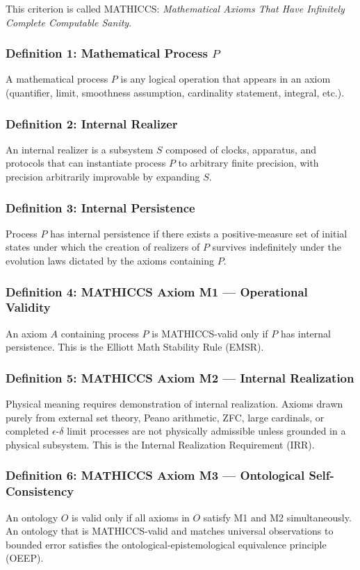 \documentclass[11pt,a4paper]{article}
\begin{document}
This criterion is called MATHICCS: \emph{Mathematical Axioms That Have Infinitely Complete Computable Sanity}.

\subsubsection{Definition 1: Mathematical Process $P$}
A mathematical process $P$ is any logical operation that appears in an axiom (quantifier, limit, smoothness assumption, cardinality statement, integral, etc.).

\subsubsection{Definition 2: Internal Realizer}
An internal realizer is a subsystem $S$ composed of clocks, apparatus, and protocols that can instantiate process $P$ to arbitrary finite precision, with precision arbitrarily improvable by expanding $S$.

\subsubsection{Definition 3: Internal Persistence}
Process $P$ has internal persistence if there exists a positive-measure set of initial states under which the creation of realizers of $P$ survives indefinitely under the evolution laws dictated by the axioms containing $P$.

\subsubsection{Definition 4: MATHICCS Axiom M1 --- Operational Validity}
An axiom $A$ containing process $P$ is MATHICCS-valid only if $P$ has internal persistence. This is the Elliott Math Stability Rule (EMSR).

\subsubsection{Definition 5: MATHICCS Axiom M2 --- Internal Realization}
Physical meaning requires demonstration of internal realization. Axioms drawn purely from external set theory, Peano arithmetic, ZFC, large cardinals, or completed $\epsilon$-$\delta$ limit processes are not physically admissible unless grounded in a physical subsystem. This is the Internal Realization Requirement (IRR).

\subsubsection{Definition 6: MATHICCS Axiom M3 --- Ontological Self-Consistency}
An ontology $O$ is valid only if all axioms in $O$ satisfy M1 and M2 simultaneously. An ontology that is MATHICCS-valid and matches universal observations to bounded error satisfies the ontological-epistemological equivalence principle (OEEP).
\end{document}

